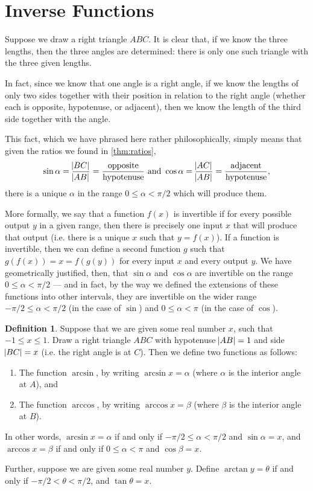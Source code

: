\documentclass[a4paper,leqno]{article}
\numberwithin{equation}{section}
\theoremstyle{definition}
\newtheorem{defn}[equation]{Definition}
\theoremstyle{remark}
\begin{document}
\section{Inverse Functions}
Suppose we draw a right triangle $ ABC $. It is clear that, if we know the three lengths, then the three angles are determined: there
is only one such triangle with the three given lengths.

In fact, since we know that one angle is a right angle, if we know the lengths of only two sides together with their position in relation
to the right angle (whether each is opposite, hypotenuse, or adjacent), then we know the length of the third side together with the angle.

This fact, which we have phrased here rather philosophically, simply means that given the ratios we found in \ref{thm:ratios},
\begin{equation}
      \sin \alpha = \frac{\abs{BC}}{\abs{AB}} = \frac{\text{opposite}}{\text{hypotenuse}} \text{ and }
      \cos \alpha = \frac{\abs{AC}}{\abs{AB}} = \frac{\text{adjacent}}{\text{hypotenuse}},
\end{equation}
there is a unique $ \alpha $ in the range $ 0 \leq \alpha < \pi/2 $ which will produce them.

More formally, we say that a function $ f(x) $ is invertible if for every possible output $ y $ in a given range, then there is precisely
one input $ x $ that will produce that output (i.e. there is a unique $ x $ such that $ y = f(x) $). If a function is invertible, then we
can define a second function $ g $ such that $ g(f(x)) = x = f(g(y)) $ for every input $ x $ and every output $ y $. We have geometrically justified, then,
that $ \sin \alpha $ and $ \cos \alpha $ are invertible on the range $ 0 \leq \alpha < \pi/2 $ --- and in fact, by the way we defined the
extensions of these functions into other intervals, they are invertible on the wider range $ -\pi/2 \leq \alpha < \pi/2 $ (in the case of $\sin$)
and $ 0 \leq \alpha < \pi $ (in the case of $\cos $).

\begin{defn}
  Suppose that we are given some real number $ x $, such that $ -1 \leq x \leq 1 $. Draw a right triangle $ ABC $ with hypotenuse $\abs{AB} = 1 $
  and side $ \abs{BC} = x $ (i.e. the right angle is at $ C $). Then we define two functions as follows:
  \begin{enumerate}
    \item The function $ \arcsin $, by writing $ \arcsin x = \alpha $ (where $ \alpha $ is the interior angle at $ A $), and
    \item The function $ \arccos $, by writing $ \arccos x = \beta $ (where $ \beta $ is the interior angle at $ B $).
  \end{enumerate}
  In other words, $ \arcsin x = \alpha $ if and only if $ -\pi/2 \leq \alpha < \pi/2 $ and $ \sin \alpha = x $, and $ \arccos x = \beta $ if
  and only if $ 0 \leq \alpha < \pi $ and $ \cos \beta = x $.

  Further, suppose we are given some real number $ y $. Define $ \arctan y = \theta $ if and only if $ -\pi/2 < \theta < \pi/2 $, and $ \tan \theta = x $.
\end{defn}
\end{document}
